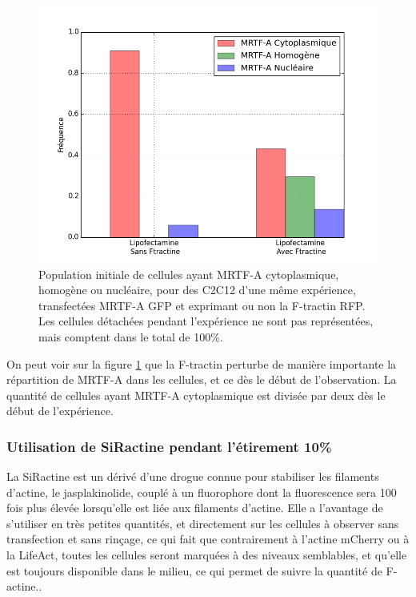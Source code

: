 \begin{figure}
\includegraphics[scale=0.4]{Figures/Ftractine.png} 
\caption{Population initiale de cellules ayant MRTF-A cytoplasmique, homogène ou nucléaire, pour des C2C12 d'une même expérience, transfectées MRTF-A GFP et exprimant ou non la F-tractin RFP. Les cellules détachées pendant l'expérience ne sont pas représentées, mais comptent dans le total de 100\%. \label{Ftractin}}
\end{figure}

On peut voir sur la figure \ref{Ftractin} que la F-tractin perturbe de manière importante la répartition de MRTF-A dans les cellules, et ce dès le début de l'observation. 
La quantité de cellules ayant MRTF-A cytoplasmique est divisée par deux dès le début de l'expérience. 


\subsubsection{Utilisation de SiRactine pendant l'étirement 10\%}
La SiRactine est un dérivé d'une drogue connue pour stabiliser les filaments d'actine, le jasplakinolide, couplé à un fluorophore dont la fluorescence sera 100 fois plus élevée lorsqu'elle est liée aux filaments d'actine. 
Elle a l'avantage de s'utiliser en très petites quantités, et directement sur les cellules à observer sans transfection et sans rinçage, ce qui fait que contrairement à l'actine mCherry ou à la LifeAct, toutes les cellules seront marquées à des niveaux semblables, et qu'elle est toujours disponible dans le milieu, ce qui permet de suivre la quantité de F-actine.. 


